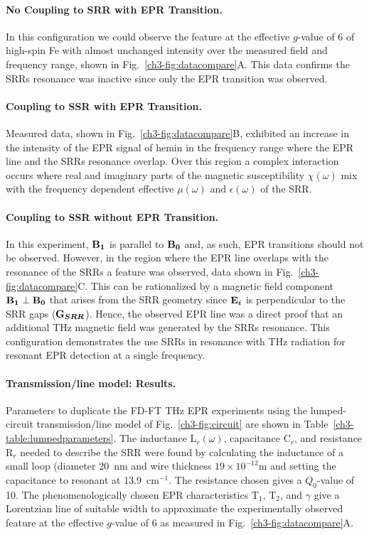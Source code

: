 \noindent \paragraph*{No Coupling to SRR with EPR Transition.} In this configuration we could observe the feature at the effective $g$-value of 6 of high-spin Fe with almost unchanged intensity over the measured field and frequency range, shown in Fig.~\ref{ch3-fig:datacompare}A. This data confirms the SRRs resonance was inactive since only the EPR transition was observed. 

\noindent \paragraph*{Coupling to SSR with EPR Transition.} Measured data, shown in Fig.~\ref{ch3-fig:datacompare}B, exhibited an increase in the intensity of the EPR signal of hemin in the frequency range where the EPR line and the SRRs resonance overlap. Over this region a complex interaction occurs where real and imaginary parts of the magnetic susceptibility $\chi(\omega)$ mix with the frequency dependent effective $\mu(\omega)$ and $\epsilon(\omega)$ of the SRR.

\noindent \paragraph*{Coupling to SSR without EPR Transition.} In this experiment, $\textbf{B}\boldsymbol{_{1}}$ is parallel to $\textbf{B}\boldsymbol{_{0}}$ and, as such, EPR transitions should not be observed. However, in the region where the EPR line overlaps with the resonance of the SRRs a feature was observed, data shown in Fig.~\ref{ch3-fig:datacompare}C. This can be rationalized by a magnetic field component $\textbf{B}\boldsymbol{_{1}}\perp\textbf{B}\boldsymbol{_{0}}$ that arises from the SRR geometry since $\textbf{E}\boldsymbol{_{i}}$ is perpendicular to the SRR gaps ($\textbf{G}\boldsymbol{_{SRR}}$). Hence, the observed EPR line was a direct proof that an additional THz magnetic field was generated by the SRRs resonance. This configuration demonstrates the use SRRs in resonance with THz radiation for resonant EPR detection at a single frequency. 

\noindent \paragraph*{Transmission\-/line model: Results.} Parameters to duplicate the FD-FT THz EPR experiments using the lumped-circuit transmission\-/line model of Fig.~\ref{ch3-fig:circuit} are shown in Table~\ref{ch3-table:lumpedparameters}. The inductance L$_r(\omega)$, capacitance C$_r$, and resistance R$_r$ needed to describe the SRR were found by calculating the inductance of a small loop (diameter 20~nm and wire thickness $19 \times 10^{-12}$m and setting the capacitance to resonant at 13.9~cm$^{-1}$. The resistance chosen gives a $Q_0$-value of 10. The phenomenologically chosen EPR characteristics T$_1$, T$_2$, and $\gamma$ give a Lorentzian line of suitable width to approximate the experimentally observed feature at the effective $g$-value of 6 as measured in Fig.~\ref{ch3-fig:datacompare}A. 

